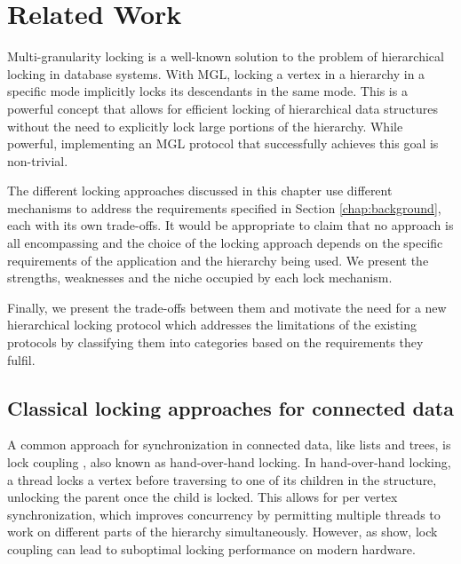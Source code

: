 \chapter{Related Work} \label{chap:relatedwork}

\minitoc

Multi-granularity locking is a well-known solution to the problem of hierarchical locking in database systems. 
With MGL, locking a vertex in a hierarchy in a specific mode implicitly locks its descendants in the same mode. 
This is a powerful concept that allows for efficient locking of hierarchical data structures without the need to explicitly lock large portions of the hierarchy.
While powerful, implementing an MGL protocol that successfully achieves this goal is non-trivial. 



The different locking approaches discussed in this chapter use different mechanisms to address the requirements specified in Section \ref{chap:background}, each with its own trade-offs. 
It would be appropriate to claim that no approach is all encompassing and the choice of the locking approach depends on the specific requirements of the application and the hierarchy being used. We present the strengths, weaknesses and the niche occupied by each lock mechanism.

Finally, we present the trade-offs between them and motivate the need for a new hierarchical locking protocol which addresses the limitations of the existing protocols by classifying them into categories based on the requirements they fulfil.


\section{Classical locking approaches for connected data}

A common approach for synchronization in connected data, like lists and trees, is lock coupling \cite{DBLP:journals/acta/BayerS77}, also known as hand-over-hand locking. In hand-over-hand locking, a thread locks a vertex before traversing to one of its children in the structure, unlocking the parent once the child is locked. 
This allows for per vertex synchronization, which improves concurrency by permitting multiple threads to work on different parts of the hierarchy simultaneously. 
However, as \citet{LeisH019} show, lock coupling can lead to suboptimal locking performance on modern hardware.


